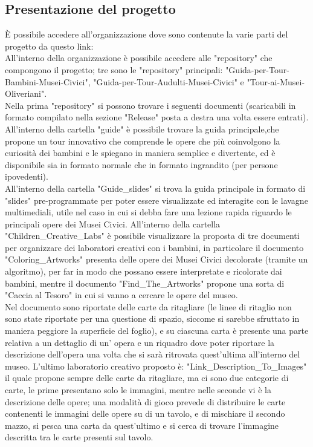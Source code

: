 \documentclass[hidelinks,12pt,a4paper]{article}
\begin{document}
\begin{flushleft}
				 \subsection{Presentazione del progetto}
				 È possibile accedere all'organizzazione dove sono contenute la varie parti del progetto da questo link:\\
				 All'interno della organizzazione è possibile accedere alle "repository" che compongono il progetto; tre sono le "repository" principali: "Guida-per-Tour-Bambini-Musei-Civici", "Guida-per-Tour-Audulti-Musei-Civici" e "Tour-ai-Musei-Oliveriani".\\
				 \bigskip
				 Nella prima "repository" si possono trovare i seguenti documenti (scaricabili in formato compilato nella sezione "Release" posta a destra una volta essere entrati).\\
				  All'interno della cartella "guide" è possibile trovare la guida principale,che propone un tour innovativo che comprende le opere che più coinvolgono la curiosità dei bambini e le spiegano in maniera semplice e divertente, ed è disponibile sia in formato normale che in formato ingrandito (per persone ipovedenti).\\
				  All'interno della cartella "Guide_slides" si trova la guida principale in formato di "slides" pre-programmate per poter essere visualizzate ed interagite con le lavagne multimediali, utile nel caso in cui si debba fare una lezione rapida riguardo le principali opere dei Musei Civici. All'interno della cartella "Children_Creative_Labs" è possibile visualizzare la proposta di tre documenti per organizzare dei laboratori creativi con i bambini, in particolare il documento "Coloring_Artworks" presenta delle opere dei Musei Civici decolorate (tramite un algoritmo), per far in modo che possano essere interpretate e ricolorate dai bambini, mentre il documento "Find_The_Artworks" propone una sorta di "Caccia al Tesoro" in cui si vanno a cercare le opere del museo.\\
				  Nel documento sono riportate delle carte da ritagliare (le linee di ritaglio non sono state riportate per una questione di spazio, siccome si sarebbe sfruttato in maniera peggiore la superficie del foglio), e su ciascuna carta è presente una parte relativa a un dettaglio di un' opera e un riquadro dove poter riportare la descrizione dell'opera una volta che si sarà ritrovata quest'ultima all'interno del museo.
				  L'ultimo laboratorio creativo proposto è: "Link_Description_To_Images" il quale propone sempre delle carte da ritagliare, ma ci sono due categorie di carte, le prime presentano solo le immagini, mentre nelle seconde vi è la descrizione delle opere; una modalità di gioco prevede di distribuire le carte contenenti le immagini delle opere su di un tavolo, e di mischiare il secondo mazzo, si pesca una carta da quest'ultimo e si cerca di trovare l'immagine descritta tra le carte presenti sul tavolo.\\

\end{flushleft}
\end{document}
